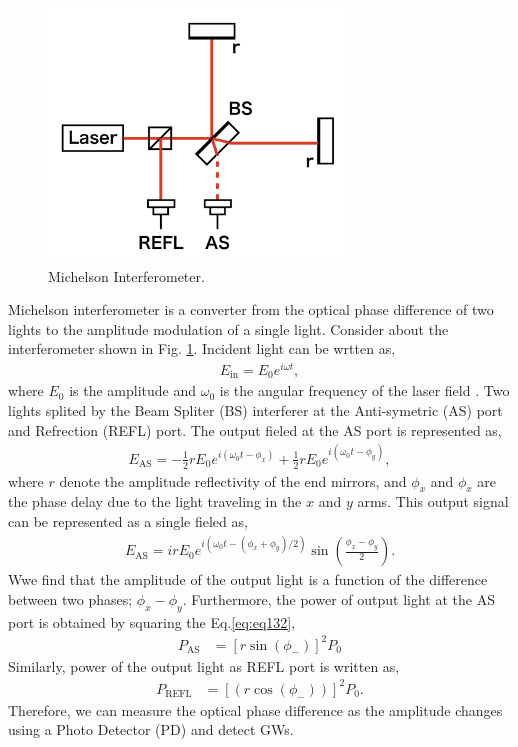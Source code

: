 \begin{figure}[H]
  \begin{center}   
    \includegraphics[width=8.0cm]{./img_chap1/img132.png}
    \caption{Michelson Interferometer. }\label{img:img132}
  \end{center}
\end{figure}

Michelson interferometer is a converter from the optical phase difference of two lights to the amplitude modulation of a single light. Consider about the interferometer shown in Fig. \ref{img:img132}. Incident light can be wrtten as,
\begin{eqnarray}
  E_{\mathrm{in}} = E_{0} e^{i\omega{t}},
\end{eqnarray}
where $E_0$ is the amplitude and $\omega_0$ is the angular frequency of the laser field
. Two lights splited by the Beam Spliter (BS) interferer at the Anti-symetric (AS) port and Refrection (REFL) port. The output fieled at the AS port is represented as,
\begin{eqnarray}
  E_{\mathrm{AS}} = -\frac{1}{2}rE_{0} e^{i\left(\omega_{0} t-\phi_{x}\right)}+\frac{1}{2}r E_{0} e^{i\left(\omega_{0} t-\phi_{y}\right)},
\end{eqnarray}
where $r$ denote the amplitude reflectivity of the end mirrors, and $\phi_{x}$ and $\phi_{x}$ are the phase delay due to the light traveling in the $x$ and $y$ arms. This output signal can be represented as a single fieled as,
\begin{eqnarray}
E_{\mathrm{AS}} = i r E_{0} e^{i\left(\omega_{0} t-\left(\phi_{x}+\phi_{y}\right) / 2\right)} \sin \left(\frac{\phi_{x}-\phi_{y}}{2}\right). \label{eq:eq132}
\end{eqnarray} 
Wwe find that the amplitude of the output light is a function of the difference between two phases; $\phi_{x}-\phi_{y}$. Furthermore, the power of output light at the AS port is obtained by squaring the Eq.\ref{eq:eq132}, 
\begin{eqnarray}
  P_{\mathrm{AS}} &=\left[r\sin({\phi_{-}})\right]^2P_0  \label{eq:eq133}
\end{eqnarray}
Similarly, power of the output light as REFL port is written as,
\begin{eqnarray}
  P_{\mathrm{REFL}} &=\left[(r\cos({\phi_{-}}))\right]^2P_0. \label{eq:eq134}
\end{eqnarray}
Therefore, we can measure the optical phase difference as the amplitude changes using a Photo Detector (PD) and detect GWs.

